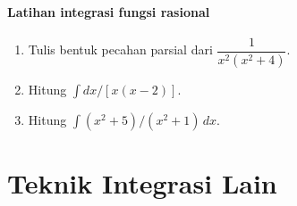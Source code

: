 \documentclass{../../kalkulus-ppt}
\begin{document}
\begin{frame}{\insertsection}
    \framesubtitle{Latihan integrasi fungsi rasional}
    \begin{latihan}
        \begin{enumerate}
            \item Tulis bentuk pecahan parsial dari $\dfrac{1}{x^2(x^2+4)}$.
            \item Hitung $\int dx/[x(x-2)]$.
            \item Hitung $\int (x^2+5)/(x^2+1)\,dx$.
        \end{enumerate}
    \end{latihan}
\end{frame}

\section{Teknik Integrasi Lain}
\end{document}
